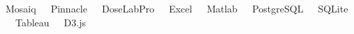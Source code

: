 \documentclass[10pt]{article}
\begin{document}
\begin{description}[leftmargin=!,labelwidth=3cm,align=left,itemsep=-9px,partopsep=-5px]
%
%
\item[Tools]
    Mosaiq\ \ \ Pinnacle\ \ \ DoseLabPro\ \ \ Excel\ \ \ Matlab\ \ \ PostgreSQL\ \ \ SQLite\ \ \ Tableau\ \ \ D3.js\\




\end{description}
\end{document}
